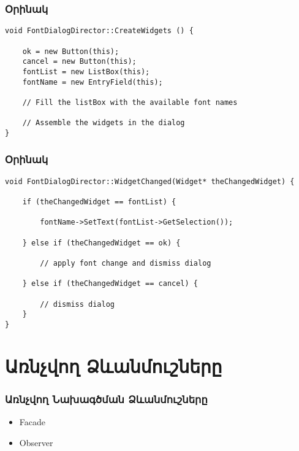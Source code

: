 \documentclass{beamer}
\begin{document}
\begin{frame}[fragile]\frametitle{Օրինակ}
\begin{english}
\begin{verbatim}
void FontDialogDirector::CreateWidgets () {

    ok = new Button(this);
    cancel = new Button(this);
    fontList = new ListBox(this);
    fontName = new EntryField(this);

    // Fill the listBox with the available font names

    // Assemble the widgets in the dialog
}
\end{verbatim}
\end{english}
\end{frame}

\begin{frame}[fragile]\frametitle{Օրինակ}
\begin{english}
\begin{verbatim}
void FontDialogDirector::WidgetChanged(Widget* theChangedWidget) {

    if (theChangedWidget == fontList) {

        fontName->SetText(fontList->GetSelection());

    } else if (theChangedWidget == ok) {

        // apply font change and dismiss dialog

    } else if (theChangedWidget == cancel) {

        // dismiss dialog
    }
}
\end{verbatim}
\end{english}
\end{frame}

\section{Առնչվող Ձևանմուշները}
\begin{frame}\frametitle{Առնչվող Նախագծման Ձևանմուշները}
\begin{itemize}
    \item Facade \vfill
    \item Observer
\end{itemize}
\end{frame}
\end{document}
